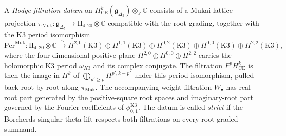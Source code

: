 \begin{definition}
\label{def:cycat-ce-hodge-filtration}
A \emph{Hodge filtration datum} on
$H^k_{\mathrm{CE}}(\mathfrak{g}_{\Delta_5}) \otimes_\mathbb{Z}\mathbb C$
consists of a Mukai-lattice projection
$\pi_{\mathrm{Muk}}\colon\mathfrak{g}_{\Delta_5}\to
\mathrm{II}_{4,20}\otimes\mathbb C$ compatible with the root grading,
together with the K3 period isomorphism
\[
 \mathrm{Per}^{\mathrm{Muk}} \colon
 \mathrm{II}_{4,20} \otimes \mathbb{C}
 \xrightarrow{\ \sim\ }
 H^{2,0}(\mathrm{K3}) \oplus H^{1,1}(\mathrm{K3}) \oplus H^{0,2}(\mathrm{K3})
 \oplus H^{0,0}(\mathrm{K3}) \oplus H^{2,2}(\mathrm{K3}),
\]
where the four-dimensional positive plane $H^{2,0} \oplus H^{0,0} \oplus
H^{2,2}$ carries the holomorphic K3 period $\omega_{K3}$ and its
complex conjugate. The filtration $F^pH^k_{\mathrm{CE}}$ is then the
image in $H^k$ of $\bigoplus_{p' \geq p}H^{p',k-p'}$ under this period
isomorphism, pulled back root-by-root along
$\pi_{\mathrm{Muk}}$. The accompanying weight filtration $W_\bullet$
has real-root part generated by the positive-square root spaces and
imaginary-root part governed by the Fourier coefficients of
$\phi_{0,1}^{\mathrm{K3}}$. The datum is called \emph{strict} if the
Borcherds singular-theta lift respects both filtrations on every
root-graded summand.
\end{definition}

